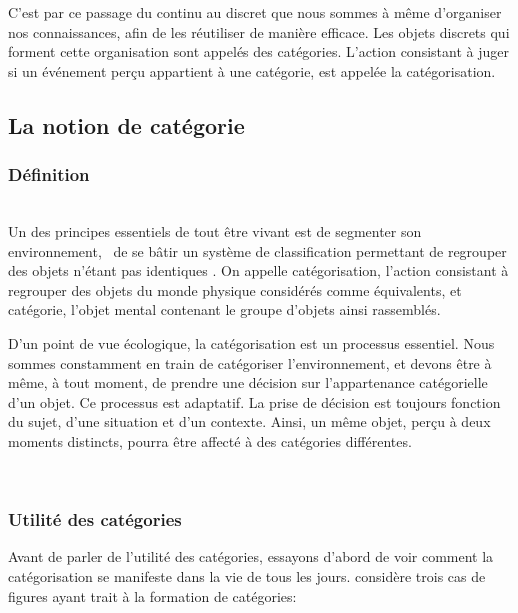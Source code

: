 C'est par ce passage du continu au discret que nous sommes à même d'organiser nos connaissances, afin de les réutiliser de manière efficace. Les objets discrets qui forment cette organisation sont appelés des catégories. L'action consistant à juger si un événement perçu appartient à une catégorie, est appelée la catégorisation.

\subsection{La notion de catégorie}

\subsubsection{Définition}

 \\

Un des principes essentiels de tout être vivant est de segmenter son environnement, \ie~de se bâtir un système de classification permettant de regrouper des objets n'étant pas identiques \citep[p. 1]{rosch1978cognition}. On appelle catégorisation, l'action consistant à regrouper des objets du monde physique considérés comme équivalents, et catégorie, l'objet mental contenant le groupe d'objets ainsi rassemblés. 
 
D'un point de vue écologique, la catégorisation est un processus essentiel. Nous sommes constamment en train de catégoriser l'environnement, et devons être à même, à tout moment, de prendre une décision sur l'appartenance catégorielle d'un objet. Ce processus est adaptatif. La prise de décision est toujours fonction du sujet, d'une situation et d'un contexte. Ainsi, un même objet, perçu à deux moments distincts, pourra être affecté à des catégories différentes.

 \\

\subsubsection{Utilité des catégories}

Avant de parler de l'utilité des catégories, essayons d'abord de voir comment la catégorisation se manifeste dans la vie de tous les jours.  \citep{anderson1991adaptive} considère trois cas de figures ayant trait à la formation de catégories:  \\

